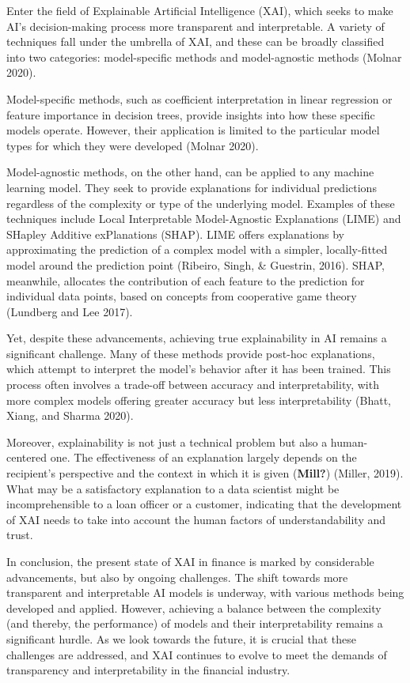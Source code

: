 \documentclass[
  letterpaper,
  DIV=11,
  numbers=noendperiod]{scrartcl}
\begin{document}
Enter the field of Explainable Artificial Intelligence (XAI), which
seeks to make AI's decision-making process more transparent and
interpretable. A variety of techniques fall under the umbrella of XAI,
and these can be broadly classified into two categories: model-specific
methods and model-agnostic methods (Molnar 2020).

Model-specific methods, such as coefficient interpretation in linear
regression or feature importance in decision trees, provide insights
into how these specific models operate. However, their application is
limited to the particular model types for which they were developed
(Molnar 2020).

Model-agnostic methods, on the other hand, can be applied to any machine
learning model. They seek to provide explanations for individual
predictions regardless of the complexity or type of the underlying
model. Examples of these techniques include Local Interpretable
Model-Agnostic Explanations (LIME) and SHapley Additive exPlanations
(SHAP). LIME offers explanations by approximating the prediction of a
complex model with a simpler, locally-fitted model around the prediction
point (Ribeiro, Singh, \& Guestrin, 2016). SHAP, meanwhile, allocates
the contribution of each feature to the prediction for individual data
points, based on concepts from cooperative game theory (Lundberg and Lee
2017).

Yet, despite these advancements, achieving true explainability in AI
remains a significant challenge. Many of these methods provide post-hoc
explanations, which attempt to interpret the model's behavior after it
has been trained. This process often involves a trade-off between
accuracy and interpretability, with more complex models offering greater
accuracy but less interpretability (Bhatt, Xiang, and Sharma 2020).

Moreover, explainability is not just a technical problem but also a
human-centered one. The effectiveness of an explanation largely depends
on the recipient's perspective and the context in which it is given
(\textbf{Mill?}) (Miller, 2019). What may be a satisfactory explanation
to a data scientist might be incomprehensible to a loan officer or a
customer, indicating that the development of XAI needs to take into
account the human factors of understandability and trust.

In conclusion, the present state of XAI in finance is marked by
considerable advancements, but also by ongoing challenges. The shift
towards more transparent and interpretable AI models is underway, with
various methods being developed and applied. However, achieving a
balance between the complexity (and thereby, the performance) of models
and their interpretability remains a significant hurdle. As we look
towards the future, it is crucial that these challenges are addressed,
and XAI continues to evolve to meet the demands of transparency and
interpretability in the financial industry.
\end{document}
